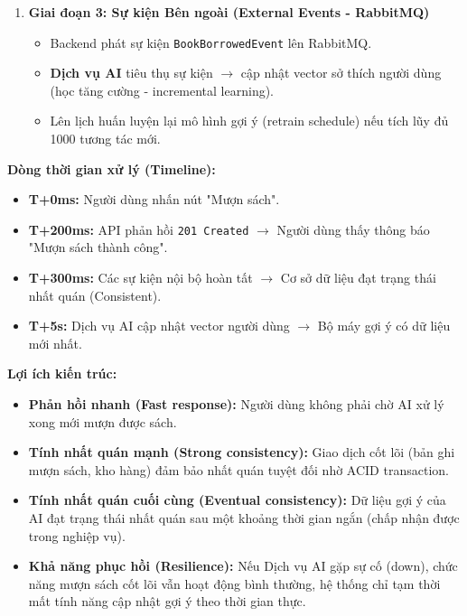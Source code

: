 \begin{enumerate}
    \item \textbf{Giai đoạn 3: Sự kiện Bên ngoài (External Events - RabbitMQ)}
    \begin{itemize}
        \item Backend phát sự kiện \texttt{BookBorrowedEvent} lên RabbitMQ.
        \item \textbf{Dịch vụ AI} tiêu thụ sự kiện $\rightarrow$ cập nhật vector sở thích người dùng (học tăng cường - incremental learning).
        \item Lên lịch huấn luyện lại mô hình gợi ý (retrain schedule) nếu tích lũy đủ 1000 tương tác mới.
    \end{itemize}
\end{enumerate}

\textbf{Dòng thời gian xử lý (Timeline):}
\begin{itemize}
    \item \textbf{T+0ms:} Người dùng nhấn nút "Mượn sách".
    \item \textbf{T+200ms:} API phản hồi \texttt{201 Created} $\rightarrow$ Người dùng thấy thông báo "Mượn sách thành công".
    \item \textbf{T+300ms:} Các sự kiện nội bộ hoàn tất $\rightarrow$ Cơ sở dữ liệu đạt trạng thái nhất quán (Consistent).
    \item \textbf{T+5s:} Dịch vụ AI cập nhật vector người dùng $\rightarrow$ Bộ máy gợi ý có dữ liệu mới nhất.
\end{itemize}

\textbf{Lợi ích kiến trúc:}
\begin{itemize}
    \item \textbf{Phản hồi nhanh (Fast response):} Người dùng không phải chờ AI xử lý xong mới mượn được sách.
    \item \textbf{Tính nhất quán mạnh (Strong consistency):} Giao dịch cốt lõi (bản ghi mượn sách, kho hàng) đảm bảo nhất quán tuyệt đối nhờ ACID transaction.
    \item \textbf{Tính nhất quán cuối cùng (Eventual consistency):} Dữ liệu gợi ý của AI đạt trạng thái nhất quán sau một khoảng thời gian ngắn (chấp nhận được trong nghiệp vụ).
    \item \textbf{Khả năng phục hồi (Resilience):} Nếu Dịch vụ AI gặp sự cố (down), chức năng mượn sách cốt lõi vẫn hoạt động bình thường, hệ thống chỉ tạm thời mất tính năng cập nhật gợi ý theo thời gian thực.
\end{itemize}





